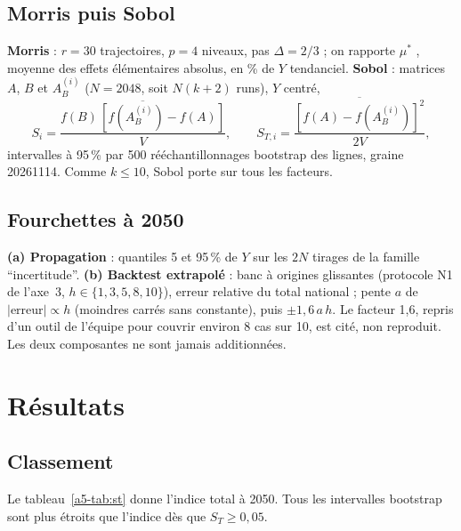 \subsection{Morris puis Sobol}
\textbf{Morris} : $r = 30$ trajectoires, $p = 4$ niveaux, pas $\Delta = 2/3$ ; on rapporte $\mu^*$ \citep{a5-campolongo2007}, moyenne des
effets élémentaires absolus, en \% de $Y$ tendanciel. \textbf{Sobol} : matrices $A$, $B$ et $A_B^{(i)}$
($N = 2048$, soit $N(k+2)$ runs), $Y$ centré,
\[
  S_i = \frac{\overline{f(B)\,[f(A_B^{(i)}) - f(A)]}}{V}, \qquad
  S_{T,i} = \frac{\overline{[f(A) - f(A_B^{(i)})]^2}}{2V},
\]
intervalles à 95\,\% par 500 rééchantillonnages bootstrap des lignes, graine \num{20261114}. Comme $k \le 10$,
Sobol porte sur tous les facteurs.

\subsection{Fourchettes à 2050}
\textbf{(a) Propagation} : quantiles 5 et 95\,\% de $Y$ sur les $2N$ tirages de la famille \enquote{incertitude}.
\textbf{(b) Backtest extrapolé} : banc à origines glissantes (protocole N1 de l'axe~3, $h \in \{1,3,5,8,10\}$),
erreur relative du total national ; pente $a$ de $|\text{erreur}| \propto h$ (moindres carrés sans constante),
puis $\pm 1{,}6\,a\,h$. Le facteur 1,6, repris d'un outil de l'équipe pour couvrir environ 8 cas sur 10, est cité,
non reproduit. Les deux composantes ne sont jamais additionnées.

\section{Résultats}\label{a5-sec:res}
\subsection{Classement}
Le tableau~\ref{a5-tab:st} donne l'indice total à 2050. Tous les intervalles bootstrap sont plus étroits que l'indice
dès que $S_T \ge 0{,}05$\mesure{}.


